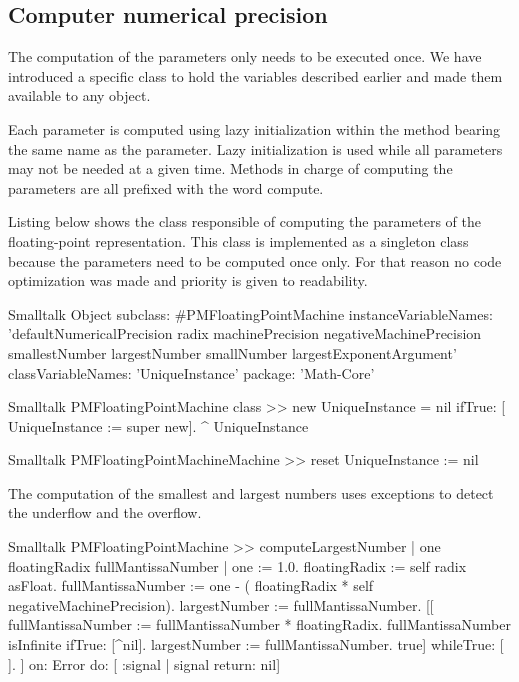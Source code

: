 \subsection{Computer numerical precision}
The computation of the parameters only needs to be executed once.
We have introduced a specific class to hold the variables
described earlier and made them available to any object.

Each parameter is computed using lazy initialization within the
method bearing the same name as the parameter. Lazy initialization
is used while all parameters may not be needed at a given time.
Methods in charge of computing the parameters are all prefixed
with the word compute.

Listing below shows the class  responsible of computing the parameters
of the floating-point representation.
This class is implemented as a singleton class because the parameters need to be computed once
only. For that reason no code optimization was made and priority
is given to readability.

\begin{displaycode}{Smalltalk}
Object subclass: #PMFloatingPointMachine
  instanceVariableNames: 'defaultNumericalPrecision radix machinePrecision negativeMachinePrecision smallestNumber largestNumber smallNumber largestExponentArgument'
  classVariableNames: 'UniqueInstance'
  package: 'Math-Core'
\end{displaycode}

\begin{displaycode}{Smalltalk}
PMFloatingPointMachine class >> new
   UniqueInstance = nil
        ifTrue: [ UniqueInstance := super new].
   ^ UniqueInstance
\end{displaycode}

\begin{displaycode}{Smalltalk}
PMFloatingPointMachineMachine >> reset
   UniqueInstance := nil
\end{displaycode}

\noindent The computation of the smallest and largest numbers uses
exceptions to detect the underflow and the overflow.

\begin{displaycode}{Smalltalk}
PMFloatingPointMachine >> computeLargestNumber
  | one floatingRadix fullMantissaNumber |
  one := 1.0.
  floatingRadix := self radix asFloat.
  fullMantissaNumber := one - ( floatingRadix * self negativeMachinePrecision).
  largestNumber := fullMantissaNumber.
  [[ fullMantissaNumber := fullMantissaNumber * floatingRadix.
      fullMantissaNumber isInfinite ifTrue: [^nil].
      largestNumber := fullMantissaNumber.
      true] whileTrue: [ ].
  ] on: Error do: [ :signal | signal return: nil]
\end{displaycode}

